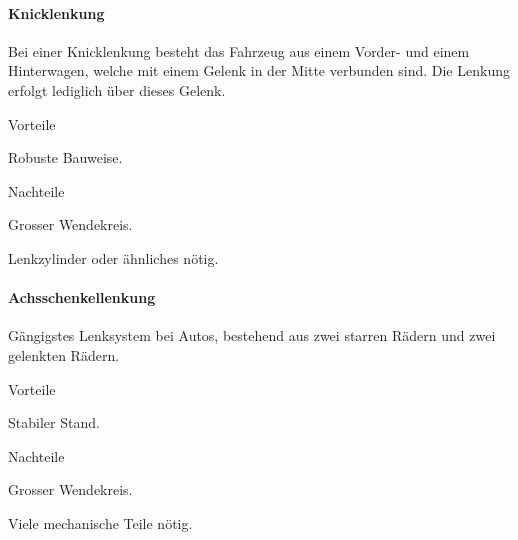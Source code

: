 \documentclass[../main.tex]{subfiles}
\begin{document}
\paragraph{Knicklenkung} \label{recherche-knicklenkung}

Bei einer Knicklenkung besteht das Fahrzeug aus einem Vorder- und einem Hinterwagen, welche mit einem Gelenk in der Mitte verbunden sind. Die Lenkung erfolgt lediglich über dieses Gelenk.

\begin{minipage}[t]{0.48\textwidth}
    \begin{items}
      \item [Vorteile]
      \item Robuste Bauweise.
 \end{items}
\end{minipage}
\hfill
\begin{minipage}[t]{0.48\textwidth}
    \begin{items}
      \item [Nachteile]
      \item Grosser Wendekreis.
      \item Lenkzylinder oder ähnliches nötig.
    \end{items}
\end{minipage}

\paragraph{Achsschenkellenkung} \label{recherche-achsschenkellenkung}

Gängigstes Lenksystem bei Autos, bestehend aus zwei starren Rädern und zwei gelenkten Rädern.

\begin{minipage}[t]{0.48\textwidth}
    \begin{items}
      \item [Vorteile]
      \item Stabiler Stand.
 \end{items}
\end{minipage}
\hfill
\begin{minipage}[t]{0.48\textwidth}
    \begin{items}
      \item [Nachteile]
      \item Grosser Wendekreis.
      \item Viele mechanische Teile nötig.
    \end{items}
\end{minipage}
\end{document}
